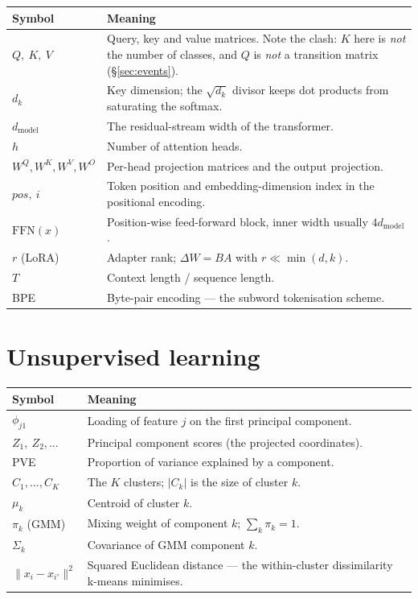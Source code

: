 \documentclass[10pt,letterpaper,onecolumn]{article}
\makeatletter
\newenvironment{symtab}
  {\begin{longtable}{@{}>{\raggedright\arraybackslash}p{0.26\textwidth}%
                       >{\raggedright\arraybackslash}p{0.70\textwidth}@{}}
   \toprule
   \textbf{Symbol} & \textbf{Meaning} \\
   \midrule
   \endhead
   \bottomrule
   \endfoot}
  {\end{longtable}}
\makeatother
\begin{document}
\begin{symtab}
$Q,\ K,\ V$ & Query, key and value matrices. Note the clash: $K$ here is \emph{not} the number of classes, and $Q$ is \emph{not} a transition matrix (\S\ref{sec:events}). \\
$d_k$ & Key dimension; the $\sqrt{d_k}$ divisor keeps dot products from saturating the softmax. \\
$d_{\text{model}}$ & The residual-stream width of the transformer. \\
$h$ & Number of attention heads. \\
$W^{Q},W^{K},W^{V},W^{O}$ & Per-head projection matrices and the output projection. \\
$pos,\ i$ & Token position and embedding-dimension index in the positional encoding. \\
$\mathrm{FFN}(x)$ & Position-wise feed-forward block, inner width usually $4d_{\text{model}}$. \\
$r$ (LoRA) & Adapter rank; $\Delta W = BA$ with $r \ll \min(d,k)$. \\
$T$ & Context length / sequence length. \\
BPE & Byte-pair encoding — the subword tokenisation scheme. \\
\end{symtab}

\section{Unsupervised learning}

\begin{symtab}
$\phi_{j1}$ & Loading of feature $j$ on the first principal component. \\
$Z_1,\ Z_2,\dots$ & Principal component scores (the projected coordinates). \\
PVE & Proportion of variance explained by a component. \\
$C_1,\dots,C_K$ & The $K$ clusters; $|C_k|$ is the size of cluster $k$. \\
$\mu_k$ & Centroid of cluster $k$. \\
$\pi_k$ (GMM) & Mixing weight of component $k$; $\sum_k \pi_k = 1$. \\
$\Sigma_k$ & Covariance of GMM component $k$. \\
$\|x_i - x_{i'}\|^2$ & Squared Euclidean distance — the within-cluster dissimilarity k-means minimises. \\
\end{symtab}
\end{document}
